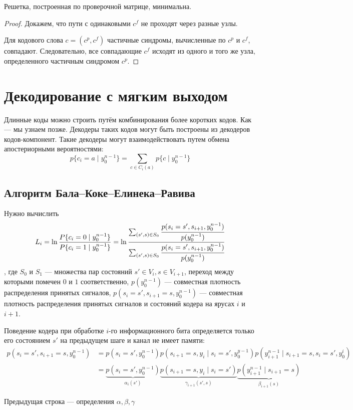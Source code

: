 \unfinished

\begin{theorem}
    Решетка, построенная по проверочной матрице, минимальна.
\end{theorem}
\begin{proof}
    Докажем, что пути с одинаковыми \(c^f\) не проходят через разные узлы.

    Для кодового слова \(c = (c^p, c^f)\) частичные синдромы,
    вычисленные по \(c^p\) и \(c^f\), совпадают.
    Следовательно, все совпадающие \(c^f\) исходят из одного и того же узла, определенного частичным синдромом \(c^p\).
\end{proof}

\section{Декодирование с мягким выходом}

Длинные коды можно строить путём комбинирования более коротких кодов. Как --- мы узнаем позже.
Декодеры таких кодов могут быть построены из декодеров кодов-компонент.
Такие декодеры могут взаимодействовать путем обмена апостериорными вероятностями:
\[p \{c_i = a \mid y_0^{n -1}\} = \sum_{c \in C_i(a)} p \{c \mid y_0^{n -1}\}\]
\?

\subsection{Алгоритм Бала--Коке--Елинека--Равива}

Нужно вычислить
\[L_i = \ln \frac{P \{c_i = 0 \mid y_0^{n -1}\}}{P \{c_i = 1 \mid y_0^{n -1}\}}
 = \ln \frac{\sum_{(s', s) \in S_0} \cfrac{p(s_i = s', s_{i+1}, y_0^{n - 1})}{p(y_0^{n -1})}}{\sum_{(s', s) \in S_0} \cfrac{p(s_i = s', s_{i+1}, y_0^{n - 1})}{p(y_0^{n -1})}}\]
, где \(S_0\) и \(S_1\) --- множества пар состояний \(s' \in V_i, s \in V_{i+1}\),
переход между которыми помечен \(0\) и \(1\) соответственно,
\(p(y_0^{n -1})\) --- совместная плотность распределения принятых сигналов,
\(p(s_i = s', s_{i+1} = s, y_0^{n - 1})\) --- совместная плотность распределения принятых сигналов и состояний кодера на ярусах \(i\) и \(i + 1\).

Поведение кодера при обработке \(i\)-го информационного бита определяется
только его состоянием \(s'\) на предыдущем шаге и канал не имеет памяти:
\begin{align}
    p(s_i = s', s_{i+1} =s, y_0^{n - 1})
    & = p(s_i = s', y_0^{n - 1}) p(s_{i+1} = s, y_i \mid s_i = s', y_0^{y - 1}) p(y_{i+1}^{n -1} \mid s_{i+1} = s, s_i = s', y_0^i) \\
    & = \underbrace{p(s_i = s', y_0^{n - 1})}_{\alpha_i(s')} \underbrace{p(s_{i+1} = s, y_i \mid s_i = s')}_{\gamma_{i+1}(s',s)} \underbrace{p(y_{i+1}^{n -1} \mid s_{i+1} = s)}_{\beta_{i+1}(s)}
\end{align}
\begin{remark}
    Предыдущая строка --- определения \(\alpha, \beta, \gamma\)
\end{remark}
